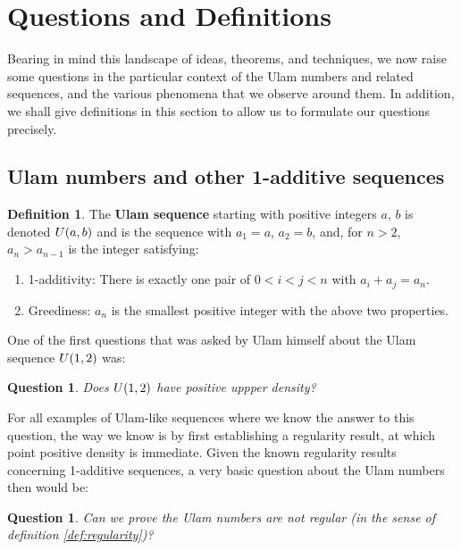 \documentclass{article}
\newtheorem{question}[theorem]{Question}
\theoremstyle{definition}
\newtheorem{definition}{Definition}
\theoremstyle{remark}
\numberwithin{equation}{section}
\begin{document}
\section{Questions and Definitions}

Bearing in mind this landscape of ideas, theorems, and techniques, we
now raise some questions in the particular context of the Ulam numbers
and related sequences, and the various phenomena that we observe
around them.  In addition, we shall give definitions in this section
to allow us to formulate our questions precisely.

\subsection{Ulam numbers and other 1-additive sequences}

\begin{definition}\label{def:ulam}
  The \textbf{Ulam sequence} starting with positive integers $a$, $b$
  is denoted $U(a,b)$ and is the sequence with $a_1 = a$,
  $a_2 = b$, and, for $n > 2$, $a_n > a_{n-1}$ is the integer satisfying:
  \begin{enumerate}
  \item 1-additivity: There is exactly one pair of $0 < i < j < n$ with $a_i + a_j = a_n$.
  \item Greediness: $a_n$ is the smallest positive integer with the above two
    properties.
\end{enumerate}

\end{definition}

One of the first questions that was asked by Ulam himself about the
Ulam sequence $U(1,2)$ was: 

\begin{question}\label{qn:density}
  Does $U(1,2)$ have positive uppper density?
\end{question}

For all examples of Ulam-like sequences where we know the answer to
this question, the way we know is by first establishing a regularity
result, at which point positive density is immediate.  Given the known
regularity results concerning 1-additive sequences, a very basic
question about the Ulam numbers then would be:

\begin{question}\label{qn:irregular}
  Can we prove the Ulam numbers are not regular (in the sense of
  definition \ref{def:regularity})?
\end{question}
\end{document}
